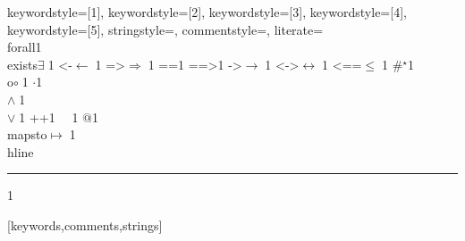 {%
    keywordstyle=[1]{\ttfamily\color{dkviolet}},
    keywordstyle=[2]{\ttfamily\color{dkgreen}},
    keywordstyle=[3]{\ttfamily\color{ltblue}},
    keywordstyle=[4]{\ttfamily\color{dkblue}},
    keywordstyle=[5]{\ttfamily\color{dkred}},
    stringstyle=\ttfamily,
    commentstyle={\ttfamily\color{dkgreen}},
    literate=
        {\\forall}{{\color{dkgreen}{$\forall\;$}}}1
        {\\exists}{{$\exists\;$}}1
        {<-}{{$\leftarrow\;$}}1
        {=>}{{$\Rightarrow\;$}}1
        {==}{{\code{==}\;}}1
        {==>}{{\code{==>}\;}}1
        {->}{{$\rightarrow\;$}}1
        {<->}{{$\leftrightarrow\;$}}1
        {<==}{{$\leq\;$}}1
        {\#}{{$^\star$}}1
        {\\o}{{$\circ\;$}}1
        {\@}{{$\cdot$}}1
        {\/\\}{{$\wedge\;$}}1
        {\\\/}{{$\vee\;$}}1
        {++}{{\code{++}}}1
        {~}{{\ }}1
        {\@\@}{{$@$}}1
        {\\mapsto}{{$\mapsto\;$}}1
        {\\hline}{{\rule{\linewidth}{0.5pt}}}1
%
}[keywords,comments,strings]
